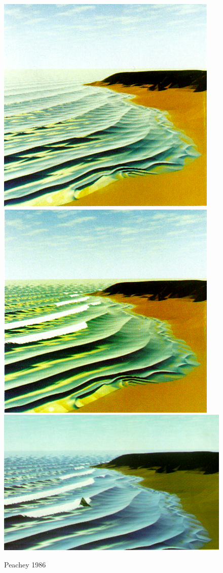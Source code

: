 \begin{figure}
 \centering
 \subtop
 {
  \includegraphics[scale=0.25]{figures/Modeling_Waves_and_Surf_-_Peachey_1986-009.png}
 }
 \hfill
 \subtop
 {
  \includegraphics[scale=0.25]{figures/Modeling_Waves_and_Surf_-_Peachey_1986-010.png}
 }
 \hfill
 \subtop
 {
  \includegraphics[scale=0.125]{figures/Modeling_Waves_and_Surf_-_Peachey_1986-012.png}
 }
 \caption{Peachey 1986}
\end{figure}

